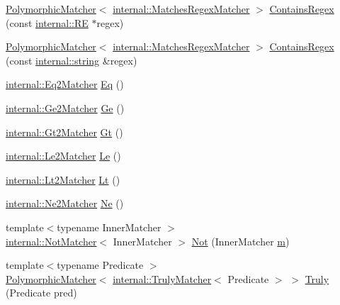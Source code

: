 \begin{DoxyCompactItemize}
\item 
\hyperlink{classtesting_1_1PolymorphicMatcher}{Polymorphic\+Matcher}$<$ \hyperlink{classtesting_1_1internal_1_1MatchesRegexMatcher}{internal\+::\+Matches\+Regex\+Matcher} $>$ \hyperlink{namespacetesting_a899838630a71376aa071dfd7c500f2ca}{Contains\+Regex} (const \hyperlink{classtesting_1_1internal_1_1RE}{internal\+::\+RE} $\ast$regex)
\item 
\hyperlink{classtesting_1_1PolymorphicMatcher}{Polymorphic\+Matcher}$<$ \hyperlink{classtesting_1_1internal_1_1MatchesRegexMatcher}{internal\+::\+Matches\+Regex\+Matcher} $>$ \hyperlink{namespacetesting_ad8efafa15630a8274f41f5e22f8f0e49}{Contains\+Regex} (const \hyperlink{namespacetesting_1_1internal_a8e8ff5b11e64078831112677156cb111}{internal\+::string} \&regex)
\item 
\hyperlink{classtesting_1_1internal_1_1Eq2Matcher}{internal\+::\+Eq2\+Matcher} \hyperlink{namespacetesting_aa7771a34f092fd6f1dca2c82fb2a36a1}{Eq} ()
\item 
\hyperlink{classtesting_1_1internal_1_1Ge2Matcher}{internal\+::\+Ge2\+Matcher} \hyperlink{namespacetesting_a8cc0a6519e30bedf52c6e53c71e18265}{Ge} ()
\item 
\hyperlink{classtesting_1_1internal_1_1Gt2Matcher}{internal\+::\+Gt2\+Matcher} \hyperlink{namespacetesting_a3eaae6408f77ba7d87ca2d6a21dbde77}{Gt} ()
\item 
\hyperlink{classtesting_1_1internal_1_1Le2Matcher}{internal\+::\+Le2\+Matcher} \hyperlink{namespacetesting_a04def1c627ea7e3fce2f08cb06e83ebc}{Le} ()
\item 
\hyperlink{classtesting_1_1internal_1_1Lt2Matcher}{internal\+::\+Lt2\+Matcher} \hyperlink{namespacetesting_a3b4d6d29d715c1bf219163f5206b53d4}{Lt} ()
\item 
\hyperlink{classtesting_1_1internal_1_1Ne2Matcher}{internal\+::\+Ne2\+Matcher} \hyperlink{namespacetesting_a0cde8994764617eebc751e682c28d4ae}{Ne} ()
\item 
{\footnotesize template$<$typename Inner\+Matcher $>$ }\\\hyperlink{classtesting_1_1internal_1_1NotMatcher}{internal\+::\+Not\+Matcher}$<$ Inner\+Matcher $>$ \hyperlink{namespacetesting_a3d7d0dda7e51b13fe2f5aa28e23ed6b6}{Not} (Inner\+Matcher \hyperlink{app_2main_8cpp_a0d2d8836216fc94b61aa0824eb239db2}{m})
\item 
{\footnotesize template$<$typename Predicate $>$ }\\\hyperlink{classtesting_1_1PolymorphicMatcher}{Polymorphic\+Matcher}$<$ \hyperlink{classtesting_1_1internal_1_1TrulyMatcher}{internal\+::\+Truly\+Matcher}$<$ Predicate $>$ $>$ \hyperlink{namespacetesting_a5faf05cfaae6074439960048e478b1c8}{Truly} (Predicate pred)

\end{DoxyCompactItemize}
